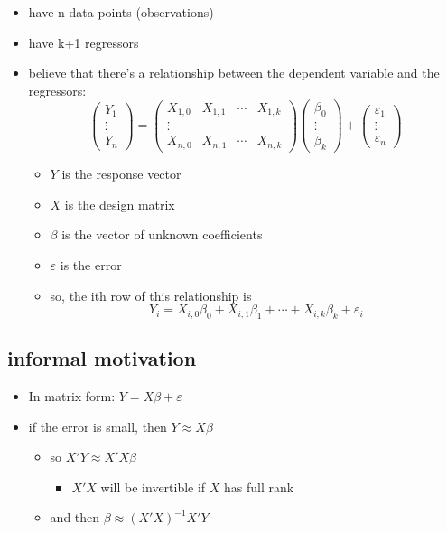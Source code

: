 \documentclass[11pt]{article}
\begin{document}
\begin{itemize}
\item have n data points (observations)
\item have k+1 regressors
\item believe that there's a relationship between the dependent
        variable and the regressors:
        \[\begin{pmatrix} Y_1 \\ \vdots \\ Y_n\end{pmatrix}
        = \begin{pmatrix} 
        X_{1,0} & X_{1,1} & \cdots & X_{1,k} \\
        \vdots \\
        X_{n,0} & X_{n,1} & \cdots & X_{n,k} \end{pmatrix}
        \begin{pmatrix}  \beta_0 \\ \vdots \\ \beta_k \end{pmatrix}+ 
        \begin{pmatrix} \varepsilon_1 \\ \vdots \\
          \varepsilon_n \end{pmatrix} \]
\begin{itemize}
\item $Y$ is the response vector
\item $X$ is the design matrix
\item $\beta$ is the vector of unknown coefficients
\item $\varepsilon$ is the error
\item so, the ith row of this relationship is
            \[Y_i = X_{i,0} \beta_0 + X_{i,1} \beta_1 + \cdots + X_{i,k}
            \beta_k + \varepsilon_i\]
\end{itemize}
\end{itemize}
\subsection{informal motivation}
\label{sec-1-2}

\begin{itemize}
\item In matrix form: $Y = X \beta + \varepsilon$
\item if the error is small, then $Y \approx X\beta$
\begin{itemize}
\item so $X'Y \approx X'X \beta$
\begin{itemize}
\item $X'X$ will be invertible if $X$ has full rank
\end{itemize}
\item and then $\beta \approx (X'X)^{-1} X'Y$
\end{itemize}
\end{itemize}
\end{document}
